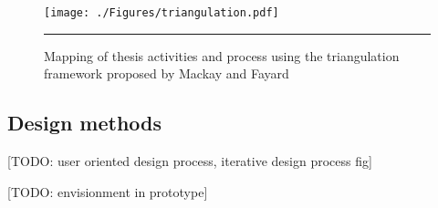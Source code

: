 \begin{figure}[htbp]
	\centering
		\texttt{[image: ./Figures/triangulation.pdf]}
		\rule{35em}{0.5pt}
	\caption[Triangulation]{Mapping of thesis activities and process using the triangulation framework proposed by Mackay and Fayard \cite{mackay_hci_1997}}
	\label{fig:triangulation}
\end{figure}

\subsection{Design methods}
[TODO: user oriented design process, iterative design process fig]

[TODO: envisionment in prototype]






